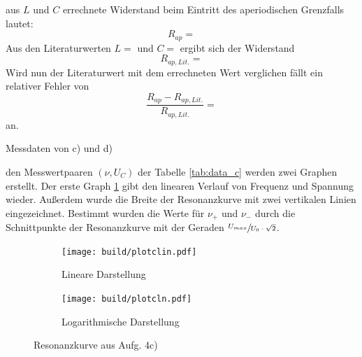   \justifying aus $L$ und $C$ errechnete Widerstand beim Eintritt des aperiodischen Grenzfalls lautet:
  \begin{equation}
  R_{ap} = \text{} \label{Rap}
  \end{equation}
  Aus den Literaturwerten $L = \text{}$ und $C =\text{}$ ergibt sich der Widerstand 
  \begin{equation}
  R_{ap, Lit.} = \text{} \label{RapLit}
  \end{equation}
  Wird nun der Literaturwert mit dem errechneten Wert verglichen fällt ein relativer Fehler von
  \begin{equation}
  \frac{R_{ap} - R_{ap,Lit.}}{R_{ap,Lit.}} = \text{} \label{RapAbw}
  \end{equation}
  an.


  
  
  \begin{table}[H]
        \centering
        \caption{Messdaten von c) und d)}
         
        \label{tab:data_c}
  \end{table}

  \justifying den Messwertpaaren $(\nu, U_C)$ der Tabelle \ref{tab:data_c} werden zwei Graphen erstellt. Der erste Graph \ref{fig:4clin} 
  gibt den linearen Verlauf von Frequenz und Spannung wieder. Außerdem wurde die Breite der Resonanzkurve mit zwei vertikalen
  Linien eingezeichnet. Bestimmt wurden die Werte für $\nu_+$ und $\nu_-$ durch die Schnittpunkte der Resonanzkurve mit der Geraden
  $\sfrac{U_{max}}{U_0\cdot\sqrt{2}}$.

  \begin{figure}[H]
    \begin{subfigure}{0.495\linewidth}
     \texttt{[image: build/plotclin.pdf]}
     \centering
     \caption{Lineare Darstellung}
     \label{fig:4clin}
    \end{subfigure}
    \begin{subfigure}{0.495\linewidth}
     \texttt{[image: build/plotcln.pdf]}
     \centering
     \caption{Logarithmische Darstellung}
     \label{fig:4cln}
    \end{subfigure}
    \caption{Resonanzkurve aus Aufg. 4c)}
  \end{figure} 

